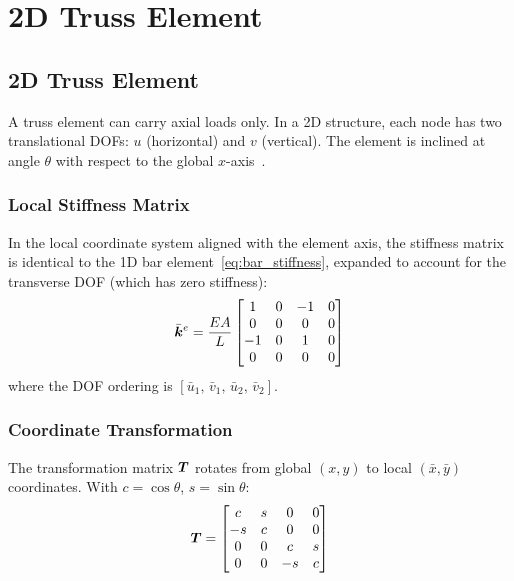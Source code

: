 \chapter{2D Truss Element}
\label{ch:truss}

\section{2D Truss Element}

A truss element can carry axial loads only. In a 2D structure, each node has
two translational DOFs: $u$ (horizontal) and $v$ (vertical). The element is
inclined at angle $\theta$ with respect to the global $x$-axis~\cite{cook2002concepts}.

\subsection{Local Stiffness Matrix}

In the local coordinate system aligned with the element axis, the stiffness
matrix is identical to the 1D bar element~\cref{eq:bar_stiffness}, expanded
to account for the transverse DOF (which has zero stiffness):
\begin{equation}
    \bar{\bm{k}}^e = \frac{EA}{L}
    \begin{bmatrix} 1 & 0 & -1 & 0 \\ 0 & 0 & 0 & 0 \\
                   -1 & 0 &  1 & 0 \\ 0 & 0 & 0 & 0 \end{bmatrix}
    \label{eq:truss_local}
\end{equation}
where the DOF ordering is $[\bar{u}_1,\, \bar{v}_1,\, \bar{u}_2,\, \bar{v}_2]$.

\subsection{Coordinate Transformation}

The transformation matrix $\bm{T}$ rotates from global $(x,y)$ to local
$(\bar{x}, \bar{y})$ coordinates. With $c = \cos\theta$, $s = \sin\theta$:
\begin{equation}
    \bm{T} = \begin{bmatrix}
         c & s & 0 & 0 \\
        -s & c & 0 & 0 \\
         0 & 0 & c & s \\
         0 & 0 &-s & c
    \end{bmatrix}
    \label{eq:truss_T}
\end{equation}

